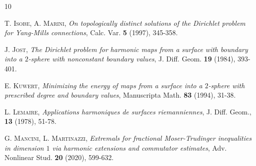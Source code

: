 \documentclass[12pt, a4paper]{article}
\newcommand{\sph}{\mathbb{S}}
\renewcommand{\(}{\left(}
\renewcommand{\)}{\right)}
\begin{document}
\begin{thebibliography}{10}







 \textsc{T. Isobe, A. Marini}, \emph{On topologically distinct solutions of the Dirichlet problem for Yang-Mills connections}, Calc. Var. \textbf{5} (1997), 345-358.


 \textsc{J. Jost}, \emph{The Dirichlet problem for harmonic maps from a surface with boundary into a $2$-sphere with nonconstant boundary values}, J. Diff. Geom. \textbf{19} (1984), 393-401.

 \textsc{E. Kuwert}, \emph{Minimizing the energy of maps from a surface into a $2$-sphere with prescribed degree and boundary values}, Manuscripta Math. \textbf{83} (1994), 31-38.



 \textsc{L. Lemaire}, \emph{Applications harmoniques de surfaces riemanniennes}, J. Diff. Geom., \textbf{13} (1978), 51-78.

 \textsc{G. Mancini, L. Martinazzi}, \emph{Extremals for fractional Moser-Trudinger inequalities in dimension $1$ via harmonic extensions and commutator estimates}, Adv. Nonlinear Stud. \textbf{20} (2020), 599-632.


\end{thebibliography}
\end{document}
